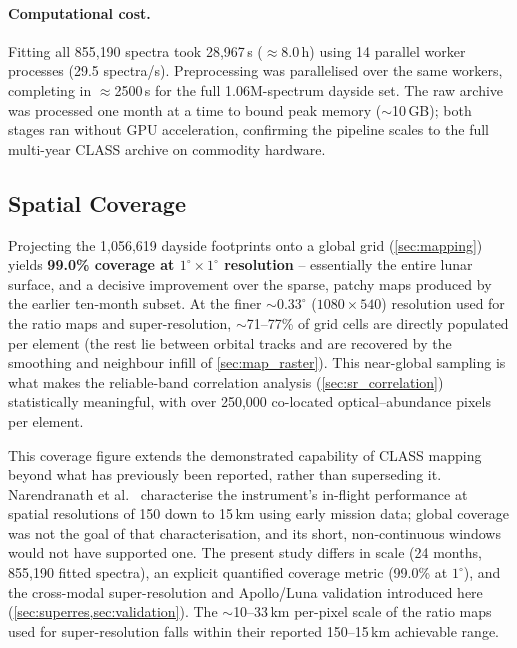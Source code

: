 \documentclass[journal,lettersize]{IEEEtran}
\begin{document}
\paragraph{Computational cost.} Fitting all 855{,}190 spectra took
28{,}967\,s ($\approx$8.0\,h) using 14 parallel worker processes (29.5
spectra/s). Preprocessing was parallelised over the same workers,
completing in $\approx$2500\,s for the full 1.06M-spectrum dayside set.
The raw archive was processed one month at a time to bound peak memory
($\sim$10\,GB); both stages ran without GPU acceleration, confirming the
pipeline scales to the full multi-year CLASS archive on commodity
hardware.

\subsection{Spatial Coverage}\label{sec:results_coverage}

Projecting the 1{,}056{,}619 dayside footprints onto a global grid
(\cref{sec:mapping}) yields \textbf{99.0\% coverage at
$1^{\circ}\times1^{\circ}$ resolution} -- essentially
the entire lunar surface, and a decisive improvement over the sparse,
patchy maps produced by the earlier ten-month subset. At the finer $\sim0.33^{\circ}$
($1080\times540$) resolution used for the ratio maps and super-resolution,
$\sim$71--77\% of grid cells are directly populated per element (the rest
lie between orbital tracks and are recovered by the smoothing and
neighbour infill of \cref{sec:map_raster}). This near-global sampling is
what makes the reliable-band correlation analysis
(\cref{sec:sr_correlation}) statistically meaningful, with over 250{,}000
co-located optical--abundance pixels per element.

This coverage figure extends the demonstrated capability of CLASS mapping
beyond what has previously been reported, rather than superseding it.
Narendranath et al.~\cite{Narendranath2020} characterise the instrument's
in-flight performance at spatial resolutions of 150 down to 15\,km using
early mission data; global coverage was not the goal of that
characterisation, and its short, non-continuous windows would not have
supported one. The present study differs in scale (24 months,
855{,}190 fitted spectra), an explicit quantified coverage metric
(99.0\% at $1^{\circ}$), and the cross-modal super-resolution and
Apollo/Luna validation introduced here
(\cref{sec:superres,sec:validation}). The $\sim$10--33\,km per-pixel
scale of the ratio maps used for super-resolution falls within their
reported 150--15\,km achievable range.
\end{document}
